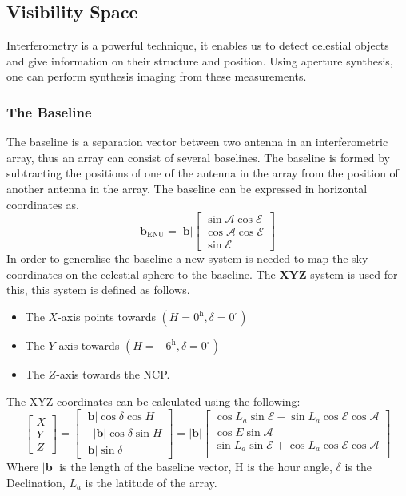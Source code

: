 \subsection{Visibility Space}
Interferometry is a powerful technique, it enables us to detect celestial objects and give information on their structure and position. Using aperture synthesis, one can perform synthesis imaging from these measurements\cite{TEXTBOOK}. 
\subsubsection{The Baseline}
The baseline is a separation vector between two antenna in an interferometric array, thus an array can consist of several baselines. The baseline is formed by subtracting the positions of one of the antenna in the array from the position of another antenna in the array. The baseline can be expressed in horizontal coordinates as. \begin{equation}
\mathbf{b}_{\text{ENU}}
=
\lvert \mathbf{b} \rvert
\begin{bmatrix}
\sin \mathcal{A} \cos \mathcal{E}\\
\cos \mathcal{A} \cos \mathcal{E}\\
\sin \mathcal{E}
\end{bmatrix}
\end{equation}
In order to generalise the baseline a new system is needed to map the sky coordinates on the celestial sphere to the baseline. The \textbf{XYZ} system is used for this, this system is defined as follows.
\begin{itemize}
    \item The $X$-axis points towards $(H=0^\textrm{h}, \delta = 0^{\circ})$ 
    \item The $Y$-axis towards $(H=-6^\textrm{h}, \delta = 0^{\circ})$ 
    \item The $Z$-axis towards the NCP.
\end{itemize}
The XYZ coordinates can be calculated using the following:
\begin{equation}
\begin{bmatrix}
X\\Y\\Z
\end{bmatrix}=
\begin{bmatrix}
\lvert \mathbf{b} \rvert \cos \delta \cos H\\
-\lvert \mathbf{b} \rvert \cos \delta \sin H\\
\lvert \mathbf{b} \rvert \sin \delta
\end{bmatrix}
= \lvert \mathbf{b} \rvert
\begin{bmatrix}
\cos L_a \sin \mathcal{E} - \sin L_a \cos \mathcal{E} \cos \mathcal{A}\nonumber\\ 
\cos E \sin \mathcal{A} \nonumber\\
\sin L_a \sin \mathcal{E} + \cos L_a \cos \mathcal{E} \cos \mathcal{A}\\
\end{bmatrix}
\end{equation}
Where $|$\textbf{b}$|$ is the length of the baseline vector, H is the hour angle, $\delta$ is the Declination, $L_a$ is the latitude of the array.

